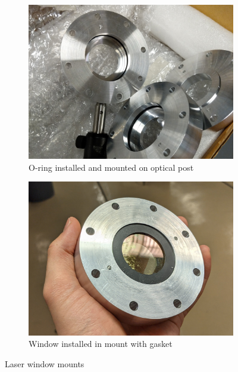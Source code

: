             \begin{figure}[h]
                \centering
                \begin{subfigure}[t]{0.48\textwidth}
                    \centering
                    \includegraphics[width=\textwidth]{assets/3 design/windowMount_empty.jpg}
                    \caption{O-ring installed and mounted on optical post}
                    \label{fig:windowMount_empty}
                \end{subfigure}
                \hfill
                \begin{subfigure}[t]{0.48\textwidth}
                    \centering
                    \includegraphics[width=\textwidth]{assets/3 design/windowMount_installed.jpg}
                    \caption{Window installed in mount with gasket}
                    \label{fig:windowMount_installed}
                \end{subfigure}
                \caption{Laser window mounts}
                \label{fig:windowMount}
            \end{figure}


